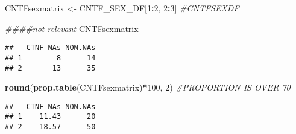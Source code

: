 \documentclass[]{article}
\newenvironment{Shaded}{\begin{snugshade}}{\end{snugshade}}
\newcommand{\CommentTok}[1]{\textcolor[rgb]{0.56,0.35,0.01}{\textit{#1}}}
\newcommand{\DecValTok}[1]{\textcolor[rgb]{0.00,0.00,0.81}{#1}}
\newcommand{\KeywordTok}[1]{\textcolor[rgb]{0.13,0.29,0.53}{\textbf{#1}}}
\newcommand{\NormalTok}[1]{#1}
\newcommand{\OperatorTok}[1]{\textcolor[rgb]{0.81,0.36,0.00}{\textbf{#1}}}
\newcommand{\StringTok}[1]{\textcolor[rgb]{0.31,0.60,0.02}{#1}}
\begin{document}
\begin{Shaded}
\begin{Highlighting}[]
\NormalTok{CNTFsexmatrix <-}\StringTok{ }\NormalTok{CNTF_SEX_DF[}\DecValTok{1}\OperatorTok{:}\DecValTok{2}\NormalTok{, }\DecValTok{2}\OperatorTok{:}\DecValTok{3}\NormalTok{]}
\CommentTok{#CNTFSEXDF}
\end{Highlighting}
\end{Shaded}

\begin{Shaded}
\begin{Highlighting}[]
\CommentTok{####not relevant}
\NormalTok{CNTFsexmatrix}
\end{Highlighting}
\end{Shaded}

\begin{verbatim}
##   CTNF NAs NON.NAs
## 1        8      14
## 2       13      35
\end{verbatim}

\begin{Shaded}
\begin{Highlighting}[]
\KeywordTok{round}\NormalTok{(}\KeywordTok{prop.table}\NormalTok{(CNTFsexmatrix)}\OperatorTok{*}\DecValTok{100}\NormalTok{, }\DecValTok{2}\NormalTok{) }\CommentTok{#PROPORTION IS OVER 70}
\end{Highlighting}
\end{Shaded}

\begin{verbatim}
##   CTNF NAs NON.NAs
## 1    11.43      20
## 2    18.57      50
\end{verbatim}

\begin{Shaded}
\end{Shaded}
\end{document}
